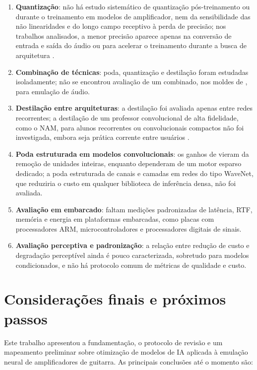 \documentclass[%
  a4paper,%
  12pt,%
  fleqn,%
  english,%
  brazilian,%
]{article}
\begin{document}
\begin{enumerate}[label = {L\arabic*:}, leftmargin = *]
\item \textbf{Quantização}: não há estudo sistemático de quantização pós-treinamento ou durante o treinamento em modelos de amplificador, nem da sensibilidade das não linearidades e do longo campo receptivo à perda de precisão; nos trabalhos analisados, a menor precisão aparece apenas na conversão de entrada e saída do áudio \cite{Sato2026} ou para acelerar o treinamento durante a busca de arquitetura \cite{Ringhofer2024}.
\item \textbf{Combinação de técnicas}: poda, quantização e destilação foram estudadas isoladamente; não se encontrou avaliação de um  combinado, nos moldes de \textcite{Han2016}, para emulação de áudio.
\item \textbf{Destilação entre arquiteturas}: a destilação foi avaliada apenas entre redes recorrentes; a destilação de um professor convolucional de alta fidelidade, como o NAM, para alunos recorrentes ou convolucionais compactos não foi investigada, embora seja prática corrente entre usuários \cite{Atkinson2025}.
\item \textbf{Poda estruturada em modelos convolucionais}: os ganhos de \textcite{Sudholt2023} vieram da remoção de unidades inteiras, enquanto \textcite{Sato2026} dependeram de um motor esparso dedicado; a poda estruturada de canais e camadas em redes do tipo WaveNet, que reduziria o custo em qualquer biblioteca de inferência densa, não foi avaliada.
\item \textbf{Avaliação em  embarcado}: faltam medições padronizadas de latência, RTF, memória e energia em plataformas embarcadas, como placas com processadores ARM, microcontroladores e processadores digitais de sinais.
\item \textbf{Avaliação perceptiva e padronização}: a relação entre redução de custo e degradação perceptível ainda é pouco caracterizada, sobretudo para modelos condicionados, e não há protocolo comum de métricas de qualidade e custo.
\end{enumerate}

\section{Considerações finais e próximos passos}%
\label{sect:concl}

Este trabalho apresentou a fundamentação, o protocolo de revisão e um mapeamento preliminar sobre otimização de modelos de IA aplicada à emulação neural de amplificadores de guitarra.
As principais conclusões até o momento são:
\end{document}

